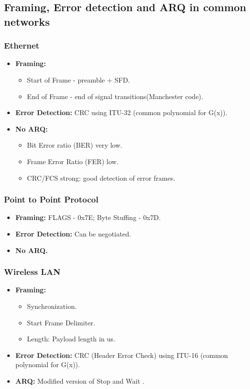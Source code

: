 \documentclass[../resumosRCOM.tex]{subfiles}
\begin{document}
\subsection{Framing, Error detection and ARQ in common networks}
\subsubsection{Ethernet}
\begin{itemize}
    \item \textbf{Framing:} 
    \begin{itemize}
        \item Start of Frame - preamble + SFD.
        \item End of Frame - end of signal transitions(Manchester code).
    \end{itemize}
    \item \textbf{Error Detection:} CRC using ITU-32 (common polynomial for G(x)).
    \item \textbf{No ARQ:} 
    \begin{itemize}
        \item Bit Error ratio (BER) very low.
        \item Frame Error Ratio (FER) low.
        \item CRC/FCS strong: good detection of error frames.
    \end{itemize}
\end{itemize}
\subsubsection{Point to Point Protocol}
\begin{itemize}
    \item \textbf{Framing:} FLAGS - 0x7E; Byte Stuffing - 0x7D.
    \item \textbf{Error Detection:} Can be negotiated.
    \item \textbf{No ARQ.}
\end{itemize}
\subsubsection{Wireless LAN}
\begin{itemize}
    \item \textbf{Framing:}
    \begin{itemize}
        \item Synchronization.
        \item Start Frame Delimiter.
        \item Length: Payload length in us.
    \end{itemize}
    \item \textbf{Error Detection:} CRC (Header Error Check) using ITU-16 (common polynomial for G(x)).
    \item \textbf{ARQ:} Modified version of Stop and Wait .
\end{itemize}
\end{document}
